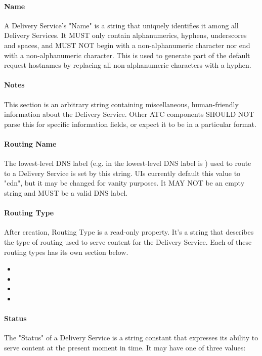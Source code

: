 \paragraph{Name}
A Delivery Service's "Name" is a string that uniquely identifies it among all
Delivery Services. It MUST only contain alphanumerics, hyphens, underscores and
spaces, and MUST NOT begin with a non-alphanumeric character nor end with a
non-alphanumeric character. This is used to generate part of the default request
hostnames by replacing all non-alphanumeric characters with a hyphen.

\paragraph{Notes}
This section is an arbitrary string containing miscellaneous, human-friendly
information about the Delivery Service. Other ATC components SHOULD NOT parse
this for specific information fields, or expect it to be in a particular format.


\paragraph{Routing Name}
The lowest-level DNS label (e.g. in 
the lowest-level DNS label is ) used to route to a
Delivery Service is set by this string. UIs currently default this value to
"cdn", but it may be changed for vanity purposes. It MAY NOT be an empty string
and MUST be a valid DNS label.

\paragraph{Routing Type}
After creation, Routing Type is a read-only property. It's a string that
describes the type of routing used to serve content for the Delivery Service.
Each of these routing types has its own section below.
\begin{itemize}
	\item {}
	\item {}
	\item {}
	\item {}
\end{itemize}

\paragraph{Status}
The "Status" of a Delivery Service is a string constant that expresses its
ability to serve content at the present moment in time. It may have one of three
values:

